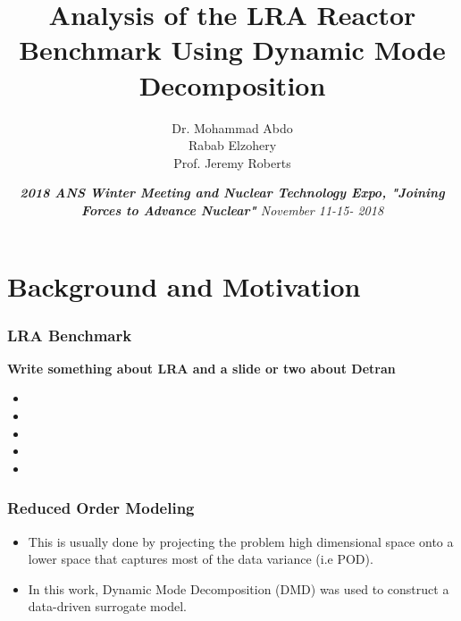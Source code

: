 \documentclass[fleqn]{beamer}
\title[]{
    Analysis of the LRA Reactor Benchmark Using Dynamic Mode Decomposition}
\author[]{
Dr. Mohammad Abdo \\
	       Rabab Elzohery \\
               Prof. Jeremy Roberts}
\institute[Kansas State University]{
    Mechanical and Nuclear Engineering \\
    Kansas State University}
\date[]{\emph{{\textbf{2018 ANS Winter Meeting and Nuclear Technology Expo, "Joining Forces to Advance Nuclear"}}
    November 11-15- 2018}}
\renewcommand{\vec}[1]{\bm{#1}} %
\begin{document}
    \newcommand{\beginbackup}{
        \newcounter{framenumbervorappendix}
        \setcounter{framenumbervorappendix}{\value{framenumber}}
    }
    \newcommand{\backupend}{
        \addtocounter{framenumbervorappendix}{-\value{framenumber}}
        \addtocounter{framenumber}{\value{framenumbervorappendix}} 
    }
    
    \begin{frame}
        \titlepage
    \end{frame}
    

    \section{Background and Motivation}
    
    \begin{frame}
        \frametitle{LRA Benchmark}
\textbf{Write something about LRA and a slide or two about Detran}       
\begin{itemize}
       \item 
       \item 
   
       \item  
%         
    \item 
    
    \item 
       
  
       \end{itemize}
    \end{frame}

    
    \begin{frame}
    \frametitle{Reduced Order Modeling}

    \begin{itemize}
   \begin{block}{ROM}
\centering
$\vec{f}(\vec{x})\approx \vec{g}(\mathcal{M}(\vec{x})); \ \ \vec{x} \subseteq \mathbb{R}^n, \mathcal{M}(\vec{x}) \in \mathbb{R}^{r_x}; r_x << n$
\end{block}

    \item This is usually done by projecting the problem high dimensional space onto a lower space that captures most of the data variance (i.e POD).
    
    \item In this work, Dynamic Mode Decomposition (DMD) was used to construct a data-driven surrogate model. 
    \end{itemize}
    \end{frame}
\end{document}
